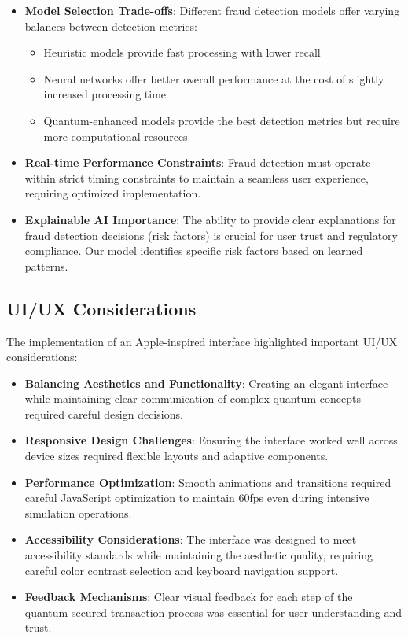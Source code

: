 \documentclass[onecolumn,a4paper,10pt]{IEEEtran}
\begin{document}
\begin{itemize}
    \item \textbf{Model Selection Trade-offs}: Different fraud detection models offer varying balances between detection metrics:
    \begin{itemize}
        \item Heuristic models provide fast processing with lower recall
        \item Neural networks offer better overall performance at the cost of slightly increased processing time
        \item Quantum-enhanced models provide the best detection metrics but require more computational resources
    \end{itemize}
    
    \item \textbf{Real-time Performance Constraints}: Fraud detection must operate within strict timing constraints to maintain a seamless user experience, requiring optimized implementation.
    
    \item \textbf{Explainable AI Importance}: The ability to provide clear explanations for fraud detection decisions (risk factors) is crucial for user trust and regulatory compliance. Our model identifies specific risk factors based on learned patterns.
\end{itemize}

\subsection{UI/UX Considerations}
The implementation of an Apple-inspired interface highlighted important UI/UX considerations:

\begin{itemize}
    \item \textbf{Balancing Aesthetics and Functionality}: Creating an elegant interface while maintaining clear communication of complex quantum concepts required careful design decisions.
    
    \item \textbf{Responsive Design Challenges}: Ensuring the interface worked well across device sizes required flexible layouts and adaptive components.
    
    \item \textbf{Performance Optimization}: Smooth animations and transitions required careful JavaScript optimization to maintain 60fps even during intensive simulation operations.
    
    \item \textbf{Accessibility Considerations}: The interface was designed to meet accessibility standards while maintaining the aesthetic quality, requiring careful color contrast selection and keyboard navigation support.
    
    \item \textbf{Feedback Mechanisms}: Clear visual feedback for each step of the quantum-secured transaction process was essential for user understanding and trust.
\end{itemize}
\end{document}
